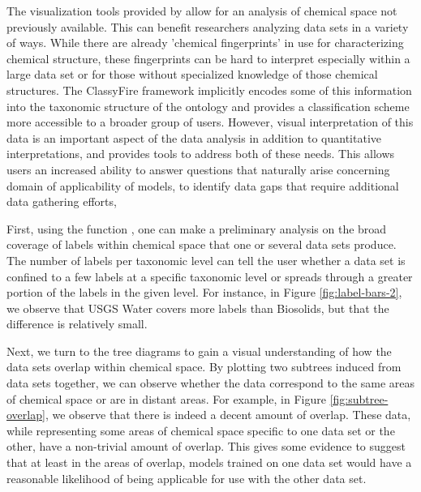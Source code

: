 \documentclass[article]{jss}
\newcommand{\fct}[1]{\code{#1()}}
\begin{document}
The visualization tools provided by  allow for an analysis of chemical space not previously available. This can benefit researchers analyzing data sets in a variety of ways. While there are already 'chemical fingerprints' in use for characterizing chemical structure, these fingerprints can be hard to interpret especially within a large data set or for those without specialized knowledge of those chemical structures. The ClassyFire framework implicitly encodes some of this information into the taxonomic structure of the ontology and provides a classification scheme more accessible to a broader group of users. However, visual interpretation of this data is an important aspect of the data analysis in addition to quantitative interpretations, and  provides tools to address both of these needs. This allows users an increased ability to answer questions that naturally arise concerning domain of applicability of models, to identify data gaps that require additional data gathering efforts,

First, using the function \fct{label\_bars}, one can make a preliminary analysis on the broad coverage of labels within chemical space that one or several data sets produce. The number of labels per taxonomic level can tell the user whether a data set is confined to a few labels at a specific taxonomic level or spreads through a greater portion of the labels in the given level. For instance, in Figure \ref{fig:label-bars-2}, we observe that USGS Water covers more labels than Biosolids, but that the difference is relatively small.

Next, we turn to the tree diagrams to gain a visual understanding of how the data sets overlap within chemical space. By plotting two subtrees induced from data sets together, we can observe whether the data correspond to the same areas of chemical space or are in distant areas. For example, in Figure \ref{fig:subtree-overlap}, we observe that there is indeed a decent amount of overlap. These data, while representing some areas of chemical space specific to one data set or the other, have a non-trivial amount of overlap. This gives some evidence to suggest that at least in the areas of overlap, models trained on one data set would have a reasonable likelihood of being applicable for use with the other data set.
\end{document}
